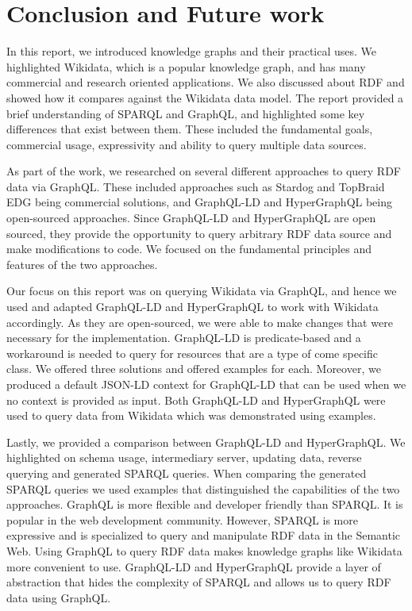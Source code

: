 \chapter{Conclusion and Future work}
\label{ch:6}
In this report, we introduced knowledge graphs and their practical uses. We highlighted Wikidata, which is a popular knowledge graph, and has many commercial and research oriented applications. We also discussed about RDF and showed how it compares against the Wikidata data model. The report provided a brief understanding of SPARQL and GraphQL, and highlighted some key differences that exist between them. These included the fundamental goals, commercial usage, expressivity and ability to query multiple data sources.

As part of the work, we researched on several different approaches to query RDF data via GraphQL. These included approaches such as Stardog and TopBraid EDG being commercial solutions, and GraphQL-LD and HyperGraphQL being open-sourced approaches. Since GraphQL-LD and HyperGraphQL are open sourced, they provide the opportunity to query arbitrary RDF data source and make modifications to code. We focused on the fundamental principles and features of the two approaches.

Our focus on this report was on querying Wikidata via GraphQL, and hence we used and adapted GraphQL-LD and HyperGraphQL to work with Wikidata accordingly. As they are open-sourced, we were able to make changes that were necessary for the implementation. GraphQL-LD is predicate-based and a workaround is needed to query for resources that are a type of come specific class. We offered three solutions and offered examples for each. Moreover, we produced a default JSON-LD context for GraphQL-LD that can be used when we no context is provided as input. Both GraphQL-LD and HyperGraphQL were used to query data from Wikidata which was demonstrated using examples.

Lastly, we provided a comparison between GraphQL-LD and HyperGraphQL. We highlighted on schema usage, intermediary server, updating data, reverse querying and generated SPARQL queries. When comparing the generated SPARQL queries we used examples that distinguished the capabilities of the two approaches.
GraphQL is more flexible and developer friendly than SPARQL. It is popular in the web development community. However, SPARQL is more expressive and is specialized to query and manipulate RDF data in the Semantic Web. Using GraphQL to query RDF data makes knowledge graphs like Wikidata more convenient to use.  GraphQL-LD and HyperGraphQL provide a layer of abstraction that hides the complexity of SPARQL and allows us to query RDF data using GraphQL.  

